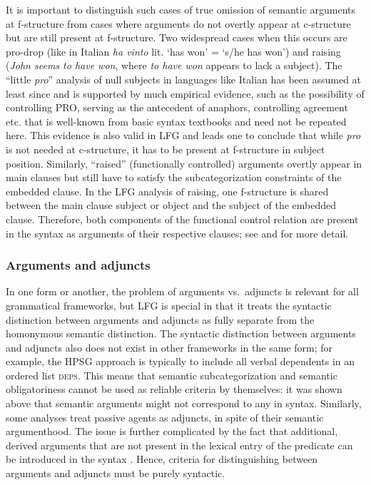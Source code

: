 \documentclass[output=paper]{../langscibook}
\begin{document}
 It is important to distinguish such cases of true omission of semantic arguments at f-structure from cases where arguments do not overtly appear at c-structure but are still present at f-structure. Two widespread cases when this occurs are pro-drop (like in Italian \textit{ha vinto} lit. `has won' = `s/he has won') and raising (\textit{John seems to have won}, where \textit{\textit{to have won}} appears to lack a subject). The ``little \textit{pro}'' analysis of null subjects in languages like Italian has been assumed at least since \citet{perlmutter1971} and is supported by much empirical evidence, such as the possibility of controlling PRO, serving as the antecedent of anaphors, controlling agreement etc. that is well-known from basic syntax textbooks and need not be repeated here. This evidence is also valid in LFG and leads one to conclude that while \textit{pro} is not needed at c-structure, it has to be present at f-structure in subject position.  Similarly, ``raised'' (functionally controlled) arguments overtly appear in main clauses but still have to satisfy the subcategorization constraints of the embedded clause. In the LFG analysis of raising, one f-structure is shared between the main clause subject or object and the subject of the embedded clause. Therefore, both components of the functional control relation are present in the syntax as arguments of their respective clauses; see  and  for more detail. 
 
 \subsubsection{Arguments and adjuncts\label{sect:gfs:argadj}} In one form or another, the problem of arguments vs.\ adjuncts is relevant for all grammatical frameworks, but LFG is special in that it treats the syntactic distinction between arguments and adjuncts as fully separate from the homonymous semantic distinction. The syntactic distinction between arguments and adjuncts also does not exist in other frameworks in the same form; for example, the HPSG approach is typically to include all verbal dependents in an ordered list \textsc{deps}. This means that semantic subcategorization and semantic obligatoriness cannot be used as reliable criteria by themselves: it was shown above that semantic arguments might not correspond to any \GF in syntax. Similarly, some analyses treat passive agents as adjuncts, in spite of their semantic argumenthood. The issue is further complicated by the fact that additional, derived arguments that are not present in the lexical entry of the predicate can be introduced in the syntax \citep{needham:arguments}. Hence, criteria for distinguishing between arguments and adjuncts must be purely syntactic.
 
\end{document}
